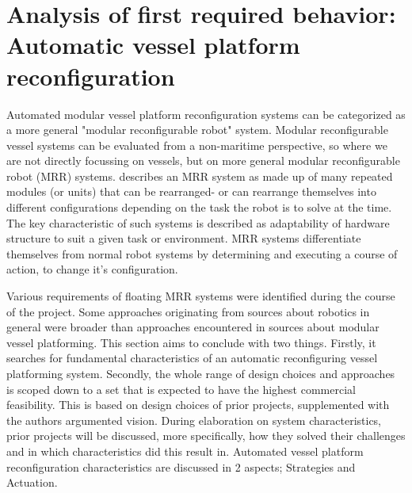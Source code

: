 \section{Analysis of first required behavior: Automatic vessel platform reconfiguration}
\label{analysisReconfiguration}

Automated modular vessel platform reconfiguration systems can be categorized as a more general "modular reconfigurable robot" system. 
Modular reconfigurable vessel systems can be evaluated from a non-maritime perspective, so where we are not directly focussing on vessels, but on more general modular reconfigurable robot (MRR) systems. \citet{seo2019modular} describes an MRR system as made up of many repeated modules (or units) that can be rearranged- or can rearrange themselves into different configurations depending on the task the robot is to solve at the time. The key characteristic of such systems is described as adaptability of hardware structure to suit a given task or environment. MRR systems differentiate themselves from normal robot systems by determining and executing a course of action, to change it's configuration. 

Various requirements of floating MRR systems were identified during the course of the project. Some approaches originating from sources about robotics in general were broader than approaches encountered in sources about modular vessel platforming. This section aims to conclude with two things. Firstly, it searches for fundamental characteristics of an automatic reconfiguring vessel platforming system. Secondly, the whole range of design choices and approaches is scoped down to a set that is expected to have the highest commercial feasibility. This is based on design choices of prior projects, supplemented with the authors argumented vision. 
During elaboration on system characteristics, prior projects will be discussed, more specifically, how they solved their challenges and in which characteristics did this result in. Automated vessel platform reconfiguration characteristics are discussed in 2 aspects; Strategies and Actuation. 



